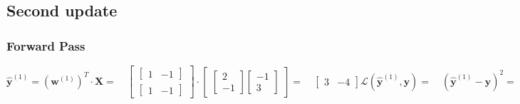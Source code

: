 \documentclass[addpoints]{exam}
\begin{document}
\subsection{Second update}
\subsubsection{Forward Pass}
\begin{subequations}
	\begin{equation}
		\hat{\textbf{y}}^{(1)} = (\textbf{w}^{(1)})^{T}\cdot \textbf{X} = \quad \begin{bmatrix}
			\begin{bmatrix}
				1& -1
			\end{bmatrix} \\
			\begin{bmatrix}
				1& -1
			\end{bmatrix}
		\end{bmatrix} \cdot \begin{bmatrix}
			\begin{bmatrix}
				2 \\-1
				
			\end{bmatrix} \begin{bmatrix}
				-1 \\3
				
			\end{bmatrix} 
		\end{bmatrix}=  \quad \begin{bmatrix}
			3&-4
		\end{bmatrix}
	\end{equation}
	\begin{equation}
		\mathscr{L}(\hat{\textbf{y}}^{(1)},\textbf{y}) = \quad (\hat{\textbf{y}}^{(1)} - \textbf{y})^{2} =\quad( \begin{bmatrix}
			3&-4 
		\end{bmatrix} - \begin{bmatrix}
			3&1 
		\end{bmatrix}) ^{2} = \quad \begin{bmatrix}
			0&25
		\end{bmatrix}
	\end{equation}
\end{subequations}
\end{document}
